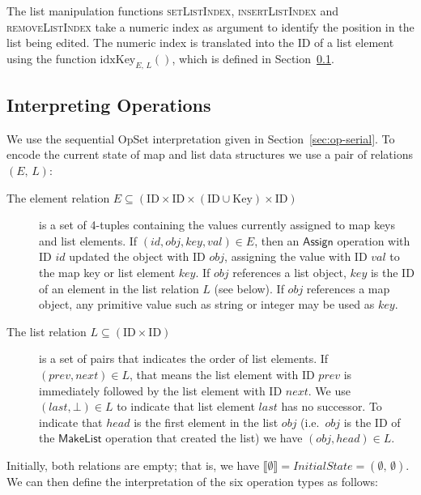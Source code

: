 The list manipulation functions \textsc{setListIndex}, \textsc{insertListIndex} and \textsc{removeListIndex} take a numeric index as argument to identify the position in the list being edited.
The numeric index is translated into the ID of a list element using the function $\mathrm{idxKey}_{E,\, L}()$, which is defined in Section~\ref{sec:datatypes-interp}.

\subsection{Interpreting Operations}\label{sec:datatypes-interp}

We use the sequential OpSet interpretation given in Section~\ref{sec:op-serial}.
To encode the current state of map and list data structures we use a pair of relations $(E,\, L)$:
\begin{description}
    \item[The element relation $E \subseteq (\mathrm{ID} \times \mathrm{ID} \times (\mathrm{ID} \cup \mathrm{Key}) \times \mathrm{ID})$]
        is a set of 4-tuples containing the values currently assigned to map keys and list elements.
        If $(\mathit{id}, \mathit{obj}, \mathit{key}, \mathit{val}) \in E$, then an $\mathsf{Assign}$ operation with ID $\mathit{id}$ updated the object with ID $\mathit{obj}$, assigning the value with ID $\mathit{val}$ to the map key or list element $\mathit{key}$.
        If $\mathit{obj}$ references a list object, $\mathit{key}$ is the ID of an element in the list relation $L$ (see below).
        If $\mathit{obj}$ references a map object, any primitive value such as string or integer may be used as $\mathit{key}$.
    \item[The list relation $L \subseteq (\mathrm{ID} \times \mathrm{ID})$] is a set of pairs that indicates the order of list elements.
        If $(\mathit{prev}, \mathit{next}) \in L$, that means the list element with ID $\mathit{prev}$ is immediately followed by the list element with ID $\mathit{next}$.
        We use $(\mathit{last}, \bot) \in L$ to indicate that list element $\mathit{last}$ has no successor.
        To indicate that $\mathit{head}$ is the first element in the list $\mathit{obj}$ (i.e.\ $\mathit{obj}$ is the ID of the $\mathsf{MakeList}$ operation that created the list) we have $(\mathit{obj}, \mathit{head}) \in L$.
\end{description}
Initially, both relations are empty; that is, we have $\llbracket\emptyset\rrbracket = \mathit{InitialState} = (\emptyset,\, \emptyset)$.
We can then define the interpretation of the six operation types as follows:
